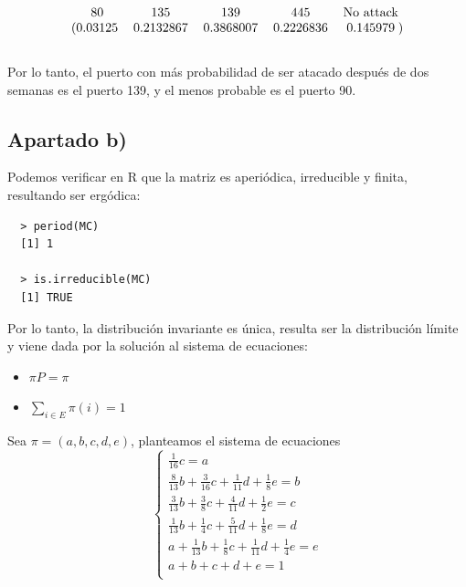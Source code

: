 \documentclass[11pt]{article}
\begin{document}
\begin{equation*}
  \begin{blockarray}{ccccc}
    80 & 135 & 139 & 445 & \text{No attack} \\
    \begin{block}{(ccccc)}
      0.03125 & 0.2132867 & 0.3868007 & 0.2226836 & 0.145979 \\
    \end{block}
  \end{blockarray}
\end{equation*}

Por lo tanto, el puerto con más probabilidad de ser atacado después de dos semanas
es el puerto 139, y el menos probable es el puerto 90.


\subsection*{Apartado b)}

Podemos verificar en R que la matriz es aperiódica, irreducible y finita, 
resultando ser ergódica:

\begin{verbatim}
  > period(MC)
  [1] 1

  > is.irreducible(MC)
  [1] TRUE  
\end{verbatim}

Por lo tanto, la distribución invariante es única, resulta ser la distribución
límite y viene dada por la solución al sistema de ecuaciones:

\begin{itemize}
  \item $\pi P = \pi$
  \item $\displaystyle\sum_{i \in E} \pi(i) = 1$
\end{itemize}

Sea $ \pi = (a, b, c, d, e) $, planteamos el sistema de ecuaciones
\[
\begin{cases}
  \frac{1}{16}c = a \\
  \frac{8}{13}b + \frac{3}{16}c + \frac{1}{11}d + \frac{1}{8}e = b \\
  \frac{3}{13}b + \frac{3}{8}c + \frac{4}{11}d + \frac{1}{2}e = c \\
  \frac{1}{13}b + \frac{1}{4}c + \frac{5}{11}d + \frac{1}{8}e = d \\
  a + \frac{1}{13}b + \frac{1}{8}c + \frac{1}{11}d + \frac{1}{4}e = e \\
  a + b + c + d + e = 1 \\
\end{cases}
\]
\end{document}
